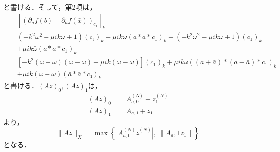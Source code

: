 \documentclass[11pt,a4paper]{jsarticle}
\theoremstyle{definition}
\begin{document}
と書ける．そして，第2項は，
\begin{equation*}
  \begin{split}
    &\left[ \left( \partial_a f(b) - \partial_a f(\bar{x}) \right)_{c_1} \right]_k \\
    =& \left( -k^2\omega^2 - \mu ik \omega + 1 \right) \left( c_1 \right)_k + \mu ik \omega (a * a * c_1)_k - \left( -k^2\bar{\omega}^2 - \mu ik \bar{\omega} + 1 \right) \left( c_1 \right)_k \\
    &+ \mu ik \bar{\omega} (\bar{a} * \bar{a} * c_1)_k \\
    =& \left[ -k^2\left(\omega + \bar{\omega}\right) \left(\omega - \bar{\omega}\right) - \mu ik \left(\omega - \bar{\omega}\right) \right] \left(c_1\right)_k + \mu ik \omega \left(\left(a+\bar{a}\right)*\left(a-\bar{a}\right)*c_1\right)_k \\
    &+ \mu ik \left(\omega - \bar{\omega}\right) \left( \bar{a} * \bar{a} * c_1 \right)_k
  \end{split}
\end{equation*}
と書ける．$(Az)_0,(Az)_1$は，
\begin{align*}
  (Az)_0 & = A_{a,0}^{(N)} + z_1^{(N)} \\
  (Az)_1 & = A_{a,1} + z_1
\end{align*}
より，
\begin{equation*}
  \|Az\|_X = \max\left\{ \left| A_{a,0}^{(N)} z_1^{(N)} \right|,\ \left\| A_a,1 z_1 \right\| \right\}
\end{equation*}
となる．
\end{document}

